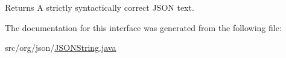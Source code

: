 \begin{DoxyReturn}{Returns}
A strictly syntactically correct J\-S\-O\-N text. 
\end{DoxyReturn}


The documentation for this interface was generated from the following file\-:\begin{DoxyCompactItemize}
\item 
src/org/json/\hyperlink{JSONString_8java}{J\-S\-O\-N\-String.\-java}\end{DoxyCompactItemize}
